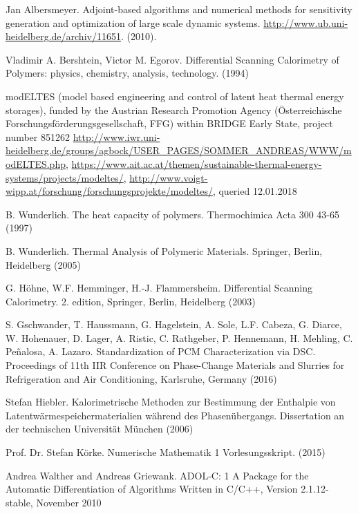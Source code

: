 \documentclass{scrartcl}[12pt, halfparskip]
\numberwithin{equation}{section}
\numberwithin{figure}{section}
\numberwithin{table}{section}
\begin{document}
\begin{thebibliography}{9}

	 Jan Albersmeyer.
	 Adjoint-based algorithms and numerical methods for sensitivity generation and optimization of large scale dynamic systems.
	 \url{http://www.ub.uni-heidelberg.de/archiv/11651}.
	 (2010).

	Vladimir A. Bershtein, Victor M. Egorov.
	Differential Scanning Calorimetry of Polymers: physics, chemistry, analysis, technology.
	(1994)
	
	modELTES (model based engineering and control of latent heat thermal energy storages), 
	funded by the Austrian Research Promotion Agency (Österreichische Forschungsförderungsgesellschaft, FFG) within BRIDGE Early State, project number 851262
	\url{http://www.iwr.uni-heidelberg.de/groups/agbock/USER_PAGES/SOMMER_ANDREAS/WWW/modELTES.php}, 
	\url{https://www.ait.ac.at/themen/sustainable-thermal-energy-systems/projects/modeltes/}, 
	\url{http://www.voigt-wipp.at/forschung/forschungsprojekte/modeltes/}, queried 12.01.2018
	
	B. Wunderlich.
	The heat capacity of polymers.
	Thermochimica Acta 300 43-65 (1997)
	
	B. Wunderlich.
	Thermal Analysis of Polymeric Materials.
	Springer, Berlin, Heidelberg (2005)
	
	G. Höhne, W.F. Hemminger, H.-J. Flammersheim.
	Differential Scanning Calorimetry.
	2. edition, Springer, Berlin, Heidelberg (2003)
	
	S. Gschwander, T. Haussmann, G. Hagelstein, A. Sole, L.F. Cabeza, G. Diarce, W. Hohenauer, D. Lager, A. Ristic, C. Rathgeber, P. Hennemann, H. Mehling, C. Peñalosa, A. Lazaro.
	Standardization of PCM Characterization via DSC.
	Proceedings of 11th IIR Conference on Phase-Change Materials and Slurries for Refrigeration and Air Conditioning, Karlsruhe, Germany (2016)
	
	Stefan Hiebler.
	Kalorimetrische Methoden zur Bestimmung
	der Enthalpie von Latentwärmespeichermaterialien
	während des Phasenübergangs.
	Dissertation an der technischen Universität München 
	(2006)
	
	Prof. Dr. Stefan Körke.
	Numerische Mathematik 1 Vorlesungsskript.
	(2015)

	Andrea Walther and Andreas Griewank.
	ADOL-C: 1
	A Package for the Automatic Differentiation
	of Algorithms Written in C/C++,
	Version 2.1.12-stable, November 2010


\end{thebibliography}
\end{document}
